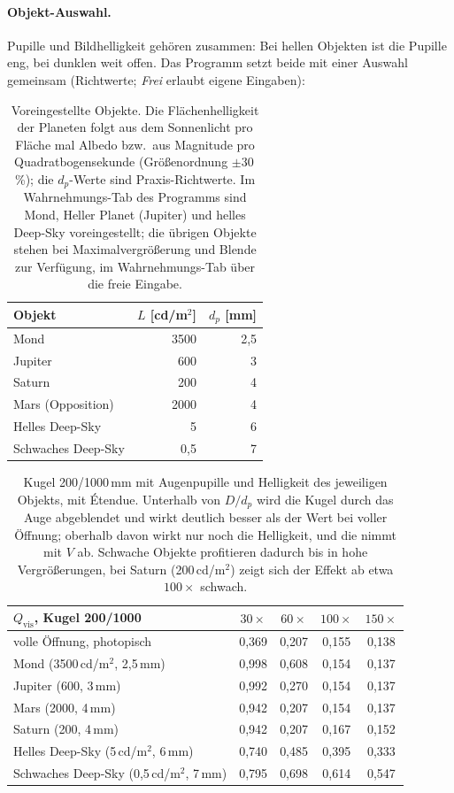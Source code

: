 \documentclass[11pt,a4paper]{article}
\newcommand{\Qvis}{Q_{\mathrm{vis}}}
\begin{document}
\paragraph{Objekt-Auswahl.} Pupille und Bildhelligkeit gehören zusammen: Bei hellen Objekten ist die Pupille eng, bei dunklen weit offen. Das Programm setzt beide mit einer Auswahl gemeinsam (Richtwerte; \emph{Frei} erlaubt eigene Eingaben):
\begin{table}[ht]
\centering
\begin{tabular}{lrr}
\toprule
Objekt & $L$ [cd/m$^2$] & $d_p$ [mm]\\
\midrule
Mond & 3500 & 2,5\\
Jupiter & 600 & 3\\
Saturn & 200 & 4\\
Mars (Opposition) & 2000 & 4\\
Helles Deep-Sky & 5 & 6\\
Schwaches Deep-Sky & 0,5 & 7\\
\bottomrule
\end{tabular}
\caption{Voreingestellte Objekte. Die Flächenhelligkeit der Planeten folgt aus dem Sonnenlicht pro Fläche mal Albedo bzw.\ aus Magnitude pro Quadratbogensekunde (Größenordnung $\pm30$\,\%); die $d_p$-Werte sind Praxis-Richtwerte. Im Wahrnehmungs-Tab des Programms sind Mond, Heller Planet (Jupiter) und helles Deep-Sky voreingestellt; die übrigen Objekte stehen bei Maximalvergrößerung und Blende zur Verfügung, im Wahrnehmungs-Tab über die freie Eingabe.}
\end{table}

\begin{table}[ht]
\centering
\begin{tabular}{lcccc}
\toprule
$\Qvis$, Kugel 200/1000 & $30\times$ & $60\times$ & $100\times$ & $150\times$\\
\midrule
volle Öffnung, photopisch & 0,369 & 0,207 & 0,155 & 0,138\\
\addlinespace
Mond (3500\,cd/m$^2$, 2,5\,mm) & 0,998 & 0,608 & 0,154 & 0,137\\
Jupiter (600, 3\,mm) & 0,992 & 0,270 & 0,154 & 0,137\\
Mars (2000, 4\,mm) & 0,942 & 0,207 & 0,154 & 0,137\\
Saturn (200, 4\,mm) & 0,942 & 0,207 & 0,167 & 0,152\\
Helles Deep-Sky (5\,cd/m$^2$, 6\,mm) & 0,740 & 0,485 & 0,395 & 0,333\\
Schwaches Deep-Sky (0,5\,cd/m$^2$, 7\,mm) & 0,795 & 0,698 & 0,614 & 0,547\\
\bottomrule
\end{tabular}
\caption{Kugel 200/1000\,mm mit Augenpupille und Helligkeit des jeweiligen Objekts, mit Étendue. Unterhalb von $D/d_p$ wird die Kugel durch das Auge abgeblendet und wirkt deutlich besser als der Wert bei voller Öffnung; oberhalb davon wirkt nur noch die Helligkeit, und die nimmt mit $V$ ab. Schwache Objekte profitieren dadurch bis in hohe Vergrößerungen, bei Saturn (200\,cd/m$^2$) zeigt sich der Effekt ab etwa $100\times$ schwach.}
\end{table}
\end{document}
